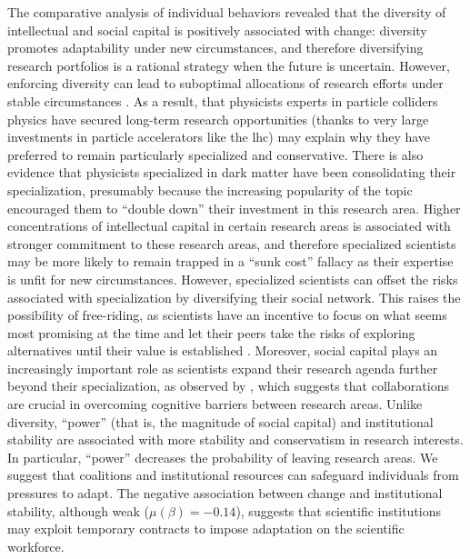 \documentclass{article}
\begin{document}
The comparative analysis of individual behaviors revealed that the diversity of intellectual and social capital is positively associated with change: diversity promotes adaptability under new circumstances, and therefore diversifying research portfolios is a rational strategy when the future is uncertain. However, enforcing diversity can lead to suboptimal allocations of research efforts under stable circumstances \citep{Schimmelpfennig2021}. As a result, that physicists experts in particle colliders physics have secured long-term research opportunities (thanks to very large investments in particle accelerators like the \gls{lhc}) may explain why they have preferred to remain particularly specialized and conservative. There is also evidence that physicists specialized in dark matter have been consolidating their specialization, presumably because the increasing popularity of the topic encouraged them to ``double down'' their investment in this research area. Higher concentrations of intellectual capital in certain research areas is associated with stronger commitment to these research areas, and therefore specialized scientists may be more likely to remain trapped in a ``sunk cost'' fallacy as their expertise is unfit for new circumstances. However, specialized scientists can offset the risks associated with specialization by diversifying their social network. This raises the possibility of free-riding, as scientists have an incentive to focus on what seems most promising at the time and let their peers take the risks of exploring alternatives until their value is established \citep{Kummerfeld2016}. Moreover, social capital plays an increasingly important role as scientists expand their research agenda further beyond their specialization, as observed by \citealt{Tripodi2020}, which suggests that collaborations are crucial in overcoming cognitive barriers between research areas. Unlike diversity, ``power'' (that is, the magnitude of social capital) and institutional stability are associated with more stability and conservatism in research interests. In particular, ``power'' decreases the probability of leaving research areas. We suggest that coalitions and institutional resources can safeguard individuals from pressures to adapt. The negative association between change and institutional stability, although weak ($\mu(\beta)=-0.14$), suggests that scientific institutions may exploit temporary contracts to impose adaptation on the scientific workforce.

\end{document}
